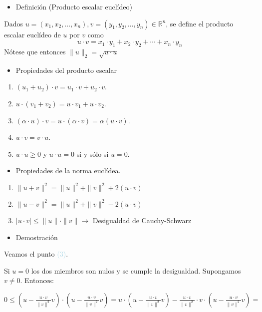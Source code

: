 \documentclass[12pt]{article}
\begin{document}
\begin{itemize}[label=\color{red}\textbullet, leftmargin=*]
\item \color{lightblue} Definición (Producto escalar euclídeo)\end{itemize}
Dados
$u=(x_1,x_2,\hdots,x_n),v=(y_1,y_2,\hdots,y_n)\in\mathbb{R}^n$,
se define el producto escalar euclídeo de $u$ por $v$ como
\[u\cdot v=x_1\cdot y_1+x_2\cdot y_2+\cdots+x_n\cdot y_n\]
Nótese que entonces $\|u\|_2=\sqrt{u\cdot u}$
\begin{itemize}[label=\color{red}\textbullet, leftmargin=*]
    \item \color{lightblue} Propiedades del producto escalar
\end{itemize}
\begin{enumerate}[label=\alph*)]
    \item $(u_1+u_2)\cdot v=u_1\cdot v+u_2\cdot v$.
    \item $u\cdot(v_1+v_2)=u\cdot v_1+u\cdot v_2$.
\item $(\alpha\cdot u)\cdot v=u\cdot(\alpha\cdot
v)=\alpha(u\cdot v)$.
    \item $u\cdot v=v\cdot u$.
    \item $u\cdot u\ge0$ y $u\cdot u=0$ si y sólo si $u=0$.
\end{enumerate}
\begin{itemize}[label=\color{red}\textbullet, leftmargin=*]
    \item \color{lightblue} Propiedades de la norma euclídea.
\end{itemize}
\begin{enumerate}
    \item $\|u+v\|^2=\|u\|^2+\|v\|^2+2(u\cdot v)$
    \item $\|u-v\|^2=\|u\|^2+\|v\|^2-2(u\cdot v)$
\item $|u\cdot v|\le\|u\|\cdot\|v\|\longrightarrow$ Desigualdad
de Cauchy-Schwarz
\end{enumerate}
\begin{itemize}[label=\color{red}\textbullet, leftmargin=*]
    \item \color{lightblue} Demostración
\end{itemize}
Veamos el punto \textcolor{lightblue}{(3)}.

Si $u=0$ los dos miembros son nulos y se cumple la desigualdad.
Supongamos $v\neq0$. Entonces:

$0\le\left(u-\frac{u\cdot
v}{\|v\|^2}v\right)\cdot\left(u-\frac{u\cdot
v}{\|v\|^2}v\right)=u\cdot\left(u-\frac{u\cdot
v}{\|v\|^2}v\right)-\frac{u\cdot v}{\|v\|^2}\cdot
v\cdot\left(u-\frac{u\cdot v}{\|v\|^2}v\right)=$
\end{document}
